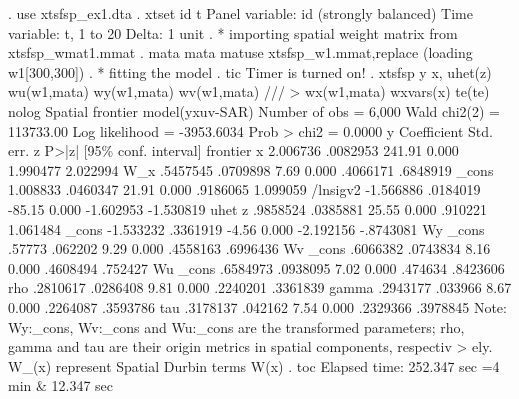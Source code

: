 . use xtsfsp_ex1.dta
{\smallskip}
. xtset id t 
{\smallskip}
Panel variable: id (strongly balanced)
 Time variable: t, 1 to 20
         Delta: 1 unit
{\smallskip}
. * importing spatial weight matrix from xtsfsp_wmat1.mmat
. mata mata matuse xtsfsp_w1.mmat,replace
(loading w1[300,300])
{\smallskip}
. * fitting the model
. tic
Timer is turned on!
{\smallskip}
. xtsfsp y x, uhet(z) wu(w1,mata) wy(w1,mata) wv(w1,mata) ///
>             wx(w1,mata) wxvars(x) te(te) nolog
{\smallskip}
Spatial frontier model(yxuv-SAR)                     Number of obs =     6,000
                                                     Wald chi2(2)  = 113733.00
Log likelihood = -3953.6034                          Prob > chi2   =    0.0000
{\smallskip}
           y {\VBAR} Coefficient  Std. err.      z    P>|z|     [95\% conf. interval]
frontier     {\VBAR}
           x {\VBAR}   2.006736   .0082953   241.91   0.000     1.990477    2.022994
         W_x {\VBAR}   .5457545   .0709898     7.69   0.000     .4066171    .6848919
       _cons {\VBAR}   1.008833   .0460347    21.91   0.000     .9186065    1.099059
    /lnsigv2 {\VBAR}  -1.566886   .0184019   -85.15   0.000    -1.602953   -1.530819
uhet         {\VBAR}
           z {\VBAR}   .9858524   .0385881    25.55   0.000      .910221    1.061484
       _cons {\VBAR}  -1.533232   .3361919    -4.56   0.000    -2.192156   -.8743081
Wy           {\VBAR}
       _cons {\VBAR}     .57773    .062202     9.29   0.000     .4558163    .6996436
Wv           {\VBAR}
       _cons {\VBAR}   .6066382   .0743834     8.16   0.000     .4608494     .752427
Wu           {\VBAR}
       _cons {\VBAR}   .6584973   .0938095     7.02   0.000      .474634    .8423606
         rho {\VBAR}   .2810617   .0286408     9.81   0.000     .2240201    .3361839
       gamma {\VBAR}   .2943177    .033966     8.67   0.000     .2264087    .3593786
         tau {\VBAR}   .3178137    .042162     7.54   0.000     .2329366    .3978845
Note: Wy:_cons, Wv:_cons and Wu:_cons are the transformed parameters;
      rho, gamma and tau are their origin metrics in spatial components, respectiv
> ely.
      W_(x) represent Spatial Durbin terms W(x)
{\smallskip}
. toc
Elapsed time: 252.347 sec
             =4 min \& 12.347 sec
{\smallskip}
